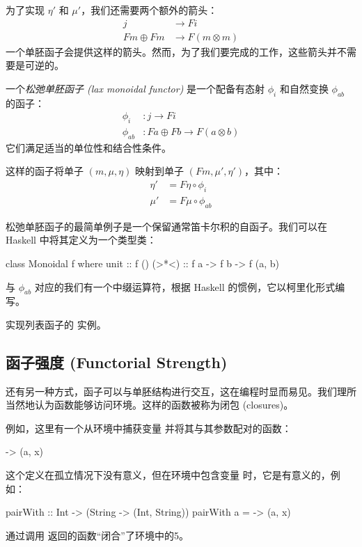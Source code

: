 \documentclass[DaoFP]{subfiles}
\begin{document}
    为了实现 $\eta'$ 和 $\mu'$，我们还需要两个额外的箭头：
    \begin{align*}
        j &\to F i \\
        F m \oplus F m &\to F (m \otimes m)
    \end{align*}
    一个单胚函子会提供这样的箭头。然而，为了我们要完成的工作，这些箭头并不需要是可逆的。

    一个\emph{松弛单胚函子 (lax monoidal functor)} 是一个配备有态射 $\phi_i$ 和自然变换 $\phi_{ab}$ 的函子：
    \begin{align*}
        \phi_i &\colon j \to F i \\
        \phi_{a b} &\colon F a \oplus F b \to F (a \otimes b)
    \end{align*}
    它们满足适当的单位性和结合性条件。

    这样的函子将单子 $(m, \mu, \eta)$ 映射到单子 $(F m, \mu', \eta')$，其中：
    \begin{align*}
        \eta' &= F \eta \circ \phi_i \\
        \mu' &= F \mu \circ \phi_{a b}
    \end{align*}

    松弛单胚函子的最简单例子是一个保留通常笛卡尔积的自函子。我们可以在 Haskell 中将其定义为一个类型类：

    \begin{haskell}
        class Monoidal f where
        unit  :: f ()
        (>*<) :: f a -> f b -> f (a, b)
    \end{haskell}
    与 $\phi_{a b}$ 对应的我们有一个中缀运算符，根据 Haskell 的惯例，它以柯里化形式编写。

    \begin{exercise}
        实现列表函子的  实例。
    \end{exercise}

    \subsection{函子强度 (Functorial Strength)}

    还有另一种方式，函子可以与单胚结构进行交互，这在编程时显而易见。我们理所当然地认为函数能够访问环境。这样的函数被称为闭包 (closures)。

    例如，这里有一个从环境中捕获变量  并将其与其参数配对的函数：
    \begin{haskell}
        \x -> (a, x)
    \end{haskell}
    这个定义在孤立情况下没有意义，但在环境中包含变量  时，它是有意义的，例如：
    \begin{haskell}
        pairWith :: Int -> (String -> (Int, String))
        pairWith a = \x -> (a, x)
    \end{haskell}
    通过调用  返回的函数``闭合''了环境中的5。
\end{document}
